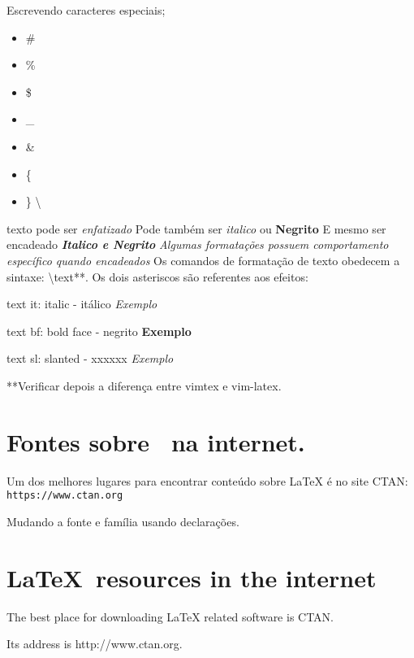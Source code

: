 \documentclass{article}
\begin{document}
Escrevendo caracteres especiais;
\begin{itemize}
        \item \#
        \item \%
        \item \$
        \item \_
        \item \&
        \item \{
        \item \}
        \textbackslash

\end{itemize}

texto pode ser \emph{enfatizado}
Pode também ser \textit{italico} ou \textbf{Negrito}
E mesmo ser encadeado \textbf{\textit{Italico e Negrito}}
\emph{Algumas formatações possuem \emph{comportamento específico} quando encadeados}
Os comandos de formatação de texto obedecem a sintaxe: 
\backslash text**. Os dois asteriscos são referentes aos efeitos:
\begin{intemize}
\item{text it: italic - itálico}
    \textit{Exemplo}
\item{text bf: bold face - negrito}
    \textbf{Exemplo}
\item{text sl: slanted - xxxxxx}
    \textsl{Exemplo}
\end{intemize}

**Verificar depois a diferença entre vimtex e vim-latex.

\section{\textsf{Fontes sobre \latex\ na internet.}}
Um dos melhores lugares para encontrar conteúdo sobre LaTeX é no site CTAN:
\texttt{https://www.ctan.org}



Mudando a fonte e família usando declarações.

\section{\sffamily\LaTeX\ resources in the internet}

The best place for downloading LaTeX related software is CTAN.

Its address is \ttfamily http://www.ctan.org\rmfamily.
\end{document}
